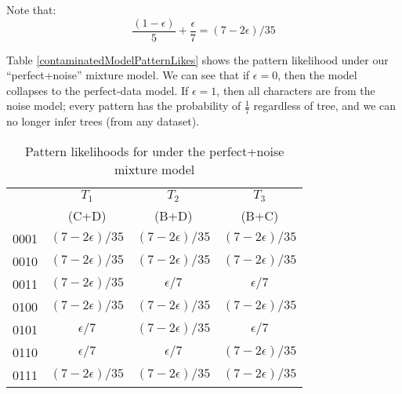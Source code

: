 \documentclass[11pt]{article}
\begin{document}
Note that:
\[\frac{(1-\epsilon)}{5} + \frac{\epsilon}{7} = (7-2\epsilon)/35 \]

Table \ref{contaminatedModelPatternLikes} shows the pattern likelihood
under our ``perfect+noise'' mixture model.
We can see that if $\epsilon=0$, then the model collapses to the perfect-data model.
If $\epsilon=1$, then all characters are from the noise model; every pattern
has the probability of $\frac{1}{7}$ regardless of tree, and we can no longer infer trees (from any dataset).

\begin{table}[htdp]
\caption{Pattern likelihoods for under the perfect+noise mixture model}\label{contaminatedModelPatternLikes}
\begin{center}
\begin{tabular}{|c|c|c|c|}
\hline
& $T_1$ & $T_2$ & $T_3$ \\
& (C+D) & (B+D) & (B+C) \\
\hline
0001 & $(7-2\epsilon)/35$ & $(7-2\epsilon)/35$  & $(7-2\epsilon)/35$  \\
0010 & $(7-2\epsilon)/35$ & $(7-2\epsilon)/35$  & $(7-2\epsilon)/35$  \\
{\color{red} 0011}&{\color{red}  $(7-2\epsilon)/35$} &{\color{red}  $\epsilon/7$ } &{\color{red}  $\epsilon/7$}  \\
0100 & $(7-2\epsilon)/35$ & $(7-2\epsilon)/35$  & $(7-2\epsilon)/35$  \\
{\color{red} 0101} &{\color{red}  $\epsilon/7$ } &{\color{red}  $(7-2\epsilon)/35$  } &{\color{red}  $\epsilon/7$  }\\
{\color{red} 0110} &{\color{red}  $\epsilon/7$ } & {\color{red}  $\epsilon/7$  } &{\color{red}  $(7-2\epsilon)/35$}  \\
0111 & $(7-2\epsilon)/35$ & $(7-2\epsilon)/35$  & $(7-2\epsilon)/35$  \\
\hline
\end{tabular}
\end{center}
\label{default}
\end{table}%
\end{document}
